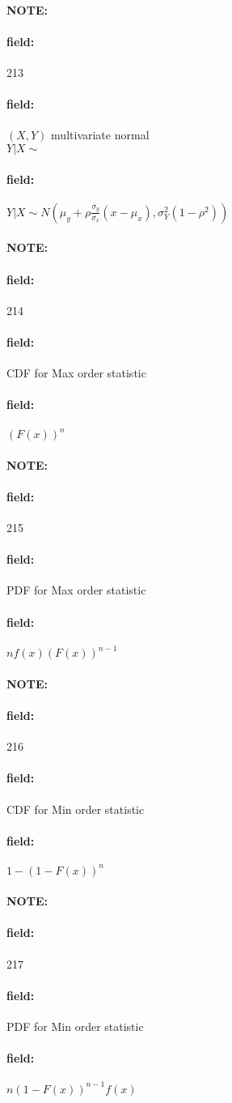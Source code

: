 \documentclass[12pt]{article}
\newenvironment{note}{\paragraph{NOTE:}}{}
\newenvironment{field}{\paragraph{field:}}{}
\begin{document}
\begin{note} \begin{field} \tiny 213 \end{field}
  \begin{field}
    $(X,Y)$ multivariate normal \\
    $Y|X\sim $
  \end{field}
  \begin{field}
    $Y|X\sim  N(\mu_y + \rho \frac{\sigma_y}{\sigma_x}(x - \mu_x), \sigma_Y^2(1 - \rho^2))$
  \end{field}
\end{note}

\begin{note} \begin{field} \tiny 214 \end{field}
  \begin{field}
    CDF for Max order statistic
  \end{field}
  \begin{field}
    $(F(x))^n$
  \end{field}
\end{note}

\begin{note} \begin{field} \tiny 215 \end{field}
  \begin{field}
    PDF for Max order statistic
  \end{field}
  \begin{field}
    $nf(x)(F(x))^{n-1}$
  \end{field}
\end{note}

\begin{note} \begin{field} \tiny 216 \end{field}
  \begin{field}
    CDF for Min order statistic
  \end{field}
  \begin{field}
    $1 - (1 - F(x))^n$
  \end{field}
\end{note}

\begin{note} \begin{field} \tiny 217 \end{field}
  \begin{field}
    PDF for Min order statistic
  \end{field}
  \begin{field}
    $n(1 - F(x))^{n-1}f(x)$
  \end{field}
\end{note}
\end{document}
